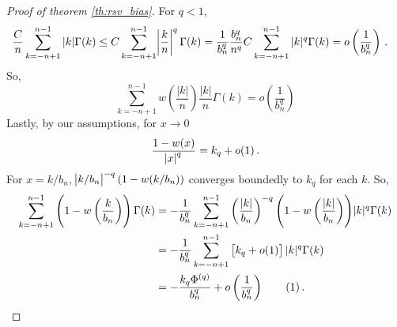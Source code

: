\documentclass[11pt]{article}
\newcommand\numberthis{\addtocounter{equation}{1}\tag{\theequation}}
\theoremstyle{remark}
\begin{document}
\begin{proof}[Proof of theorem \ref{th:rsv_bias}]
For $q <1$,
\begin{align*}
   \dfrac{C}{n}\sum_{k = -n+1}^{n-1}|k|  \Gamma(k)  &\leq C\sum_{k =-n+1}^{n-1}\abs{\dfrac{k}{n}}^q  \Gamma(k)  = \dfrac{1}{b_n^q}\dfrac{b_n^q}{n^q} C \sum_{k =-n+1}^{n-1}|k|^q \Gamma(k)  = o\left(\dfrac{1}{b_n^q}\right) \, .
\end{align*}
So,
\begin{equation}
\label{eq:P1_second}
 \sum_{k = -n+1}^{n-1}w\left(\dfrac{|k|}{n}\right)\dfrac{|k|}{n}\Gamma(k) = o \left(\dfrac{1}{b_n^q} \right)
\end{equation}
Lastly, by our assumptions, for $x \to 0$
\[
\dfrac{1 - w(x)}{\abs{x}^q} = k_q + o(1)\,.
\]
For $x = k/b_n$, $\abs{k/b_n}^{-q}(1-w(k/b_n))$ converges boundedly to $k_q$ for each $k$.
So,
\begin{align*}
     \sum_{k = -n+1}^{n-1}\left(1-w\left(\dfrac{k}{b_n}\right)\right)\Gamma(k) &= -\dfrac{1}{b_n^q}\sum_{k = -n+1}^{n-1}  \left(\dfrac{|k|}{b_n}\right)^{-q} {\left(1-w\left(\dfrac{|k|}{b_n}\right)\right)}|k|^q \Gamma(k) \\
     & = -\dfrac{1}{b_n^q}\sum_{k = -n+1}^{n-1}   \left[k_q + o(1) \right]|k|^q \Gamma(k) \\
     & = -\dfrac{k_q \Phi^{(q)} }{b_n^q} + o\left( \dfrac{1}{b_n^q} \right) \numberthis \label{eq:P1_third}\,.
\end{align*}
%

\end{proof}
\end{document}
